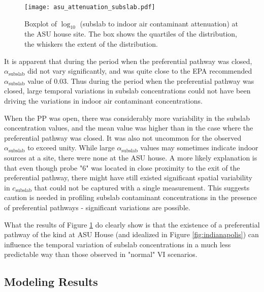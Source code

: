 \documentclass[preprint,12pt]{elsarticle}
\begin{document}
\begin{figure}[htb!]
  \centering
 \texttt{[image: asu\_attenuation\_subslab.pdf]}
 \caption{Boxplot of $\log_{10}$ (subslab to indoor air contaminant attenuation) at the ASU house site. The box shows the quartiles of the distribution, the whiskers the extent of the distribution.}\label{fig:attenuation_subslab}
\end{figure}

It is apparent that during the period when the preferential pathway was closed, $\alpha_\mathrm{subslab}$ did not vary significantly, and was quite close to the EPA recommended $\alpha_\mathrm{subslab}$ value of 0.03\cite{u.s._environmental_protection_agency_oswer_2015}.
Thus during the period when the preferential pathway was closed, large temporal variations in subslab concentrations could not have been driving the variations in indoor air contaminant concentrations.\par

When the PP was open, there was considerably more variability in the subslab concentration values, and the mean value was higher than in the case where the preferential pathway was closed.
It was also not uncommon for the observed $\alpha_\mathrm{subslab}$ to exceed unity.
While large $\alpha_\mathrm{subslab}$ values may sometimes indicate indoor sources at a site, there were none at the ASU house.
A more likely explanation is that even though probe "6" was located in close proximity to the exit of the preferential pathway, there might have still existed significant spatial variability in $c_\mathrm{subslab}$ that could not be captured with a single measurement.
This suggests caution is needed in profiling subslab contaminant concentrations in the presence of preferential pathways - significant variations are possible.\par

What the results of Figure \ref{fig:attenuation_subslab} do clearly show is that the existence of a preferential pathway of the kind at ASU House (and idealized in Figure \ref{fig:indianapolis}) can influence the temporal variation of subslab concentrations in a much less predictable way than those observed in "normal" VI scenarios.\par

\subsection{Modeling Results}\label{s:results_modeling}
\end{document}
